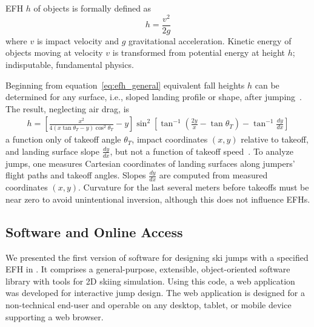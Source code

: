 \documentclass[smallextended]{svjour3}       %
\begin{document}
EFH $h$ of objects is formally defined as
%
\begin{equation}
  h = \frac{v^2}{2g}
  \label{eq:efh_general}
\end{equation}
%
where $v$ is impact velocity and $g$ gravitational acceleration.  Kinetic
energy of objects moving at  velocity $v$  is transformed from potential energy
at height $h$; indisputable, fundamental physics.

Beginning from equation~\ref{eq:efh_general} equivalent fall heights $h$ can be
determined for any surface, i.e., sloped landing profile or shape, after
jumping~\cite{Petrone2017}. The result, neglecting air drag, is
%
\begin{align}
  h = \left[\frac{x^2}{4(x\tan\theta_T - y)\cos^{2}\theta_T} - y\right]
    \sin^{2}
    \left[\tan^{-1}\left(\frac{2y}{x} - \tan\theta_T\right) -
    \tan^{-1}\frac{dy}{dx}\right]
  \label{eq:efh}
\end{align}
%
a function only of takeoff angle $\theta_T$, impact coordinates $(x,y)$
relative to takeoff, and landing surface slope $\frac{dy}{dx}$, but not a
function of takeoff speed~\cite{Petrone2017}. To analyze jumps, one measures
Cartesian coordinates of landing surfaces along jumpers' flight paths and
takeoff angles. Slopes $\frac{dy}{dx}$ are computed from measured coordinates
$(x,y)$. Curvature for the last several meters before takeoffs must be near
zero to avoid unintentional inversion, although this does not influence EFHs.

\subsection{Software and Online Access}
\label{sec:software}
%
We presented the first version of software for designing ski jumps with a
specified EFH in \cite{Moore2018}. It comprises a general-purpose, extensible,
object-oriented software library with tools for 2D skiing simulation. Using
this code, a web application was developed for interactive jump design. The web
application is designed for a non-technical end-user and operable on any
desktop, tablet, or mobile device supporting a web browser.
\end{document}
